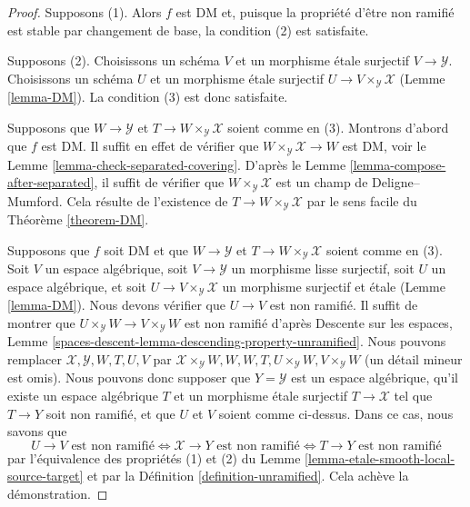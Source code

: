 \begin{proof}
Supposons (1). Alors $f$ est DM et, puisque la propri\'et\'e d'\^etre non
ramifi\'e est stable par changement de base, la condition (2) est satisfaite.

\medskip\noindent
Supposons (2). Choisissons un sch\'ema $V$ et un morphisme \'etale surjectif
$V \to \mathcal{Y}$. Choisissons un sch\'ema $U$ et un morphisme \'etale surjectif
$U \to V \times_\mathcal{Y} \mathcal{X}$ (Lemme \ref{lemma-DM}).
La condition (3) est donc satisfaite.

\medskip\noindent
Supposons que $W \to \mathcal{Y}$ et $T \to W \times_\mathcal{Y} \mathcal{X}$
soient comme en (3). Montrons d'abord que $f$ est DM. Il suffit en effet de
v\'erifier que $W \times_\mathcal{Y} \mathcal{X} \to W$ est DM, voir le
Lemme \ref{lemma-check-separated-covering}.
D'apr\`es le Lemme \ref{lemma-compose-after-separated},
il suffit de v\'erifier que $W \times_\mathcal{Y} \mathcal{X}$ est un champ
de Deligne--Mumford. Cela r\'esulte de l'existence de
$T \to W \times_\mathcal{Y} \mathcal{X}$ par le sens facile du
Th\'eor\`eme \ref{theorem-DM}.

\medskip\noindent
Supposons que $f$ soit DM et que $W \to \mathcal{Y}$ et
$T \to W \times_\mathcal{Y} \mathcal{X}$ soient comme en (3).
Soit $V$ un espace alg\'ebrique, soit $V \to \mathcal{Y}$ un morphisme
lisse surjectif, soit $U$ un espace alg\'ebrique, et soit
$U \to V \times_\mathcal{Y} \mathcal{X}$ un morphisme surjectif et \'etale
(Lemme \ref{lemma-DM}). Nous devons v\'erifier que $U \to V$ est non ramifi\'e.
Il suffit de montrer que $U \times_\mathcal{Y} W \to V \times_\mathcal{Y} W$
est non ramifi\'e d'apr\`es Descente sur les espaces, Lemme
\ref{spaces-descent-lemma-descending-property-unramified}.
Nous pouvons remplacer $\mathcal{X}, \mathcal{Y}, W, T, U, V$ par
$\mathcal{X} \times_\mathcal{Y} W, W, W, T, U \times_\mathcal{Y} W,
V \times_\mathcal{Y} W$ (un d\'etail mineur est omis).
Nous pouvons donc supposer que $Y = \mathcal{Y}$ est un espace alg\'ebrique,
qu'il existe un espace alg\'ebrique $T$ et un morphisme \'etale surjectif
$T \to \mathcal{X}$ tel que $T \to Y$ soit non ramifi\'e, et que $U$ et $V$
soient comme ci-dessus. Dans ce cas, nous savons que
$$
U \to V\text{ est non ramifi\'e}
\Leftrightarrow
\mathcal{X} \to Y\text{ est non ramifi\'e}
\Leftrightarrow
T \to Y\text{ est non ramifi\'e}
$$
par l'\'equivalence des propri\'et\'es (1) et (2) du
Lemme \ref{lemma-etale-smooth-local-source-target}
et par la D\'efinition \ref{definition-unramified}.
Cela ach\`eve la d\'emonstration.
\end{proof}


